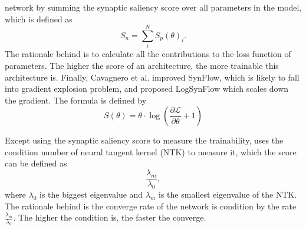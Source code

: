 \documentclass[sigconf]{acmart}
\begin{document}
    network by summing the synaptic saliency score over all parameters in the model, which is 
    defined as 
    \begin{equation}
        \label{equ:zero_cost}
        S_n=\sum^N_i S_p(\theta)_i.
    \end{equation}
    The rationale behind is to calculate all the contributions to the loss function of parameters. 
    The higher the score of an architecture, the more trainable this architecture is. 
    Finally, Cavagnero et al. \cite{Cavagnero_2023} improved SynFlow, which is likely to fall into 
    gradient explosion problem, and proposed LogSynFlow which scales down the gradient. 
    The formula is defined by 
    \begin{equation}
        \label{equ:logsynflow}
        S(\theta)=\theta\cdot\log(\frac{\partial \mathcal L}{\partial \theta}+1)
    \end{equation}

    Except using the synaptic saliency score to measure the trainability, 
    \cite{https://doi.org/10.48550/arxiv.2102.11535} uses the condition number of neural tangent 
    kernel (NTK) \cite{jacot2020neural} to measure it, which the score can be defined as 
    \begin{equation}
        \label{equ:cn_ntk}
        \frac{\lambda_m}{\lambda_0}, 
    \end{equation}
    where $\lambda_0$ is the biggest eigenvalue and $\lambda_m$ is the smallest eigenvalue of the 
    NTK. The rationale behind is the converge rate of the network is condition by the rate 
    $\frac{\lambda_m}{\lambda_0}$. The higher the condition is, the faster the converge. 
\end{document}
